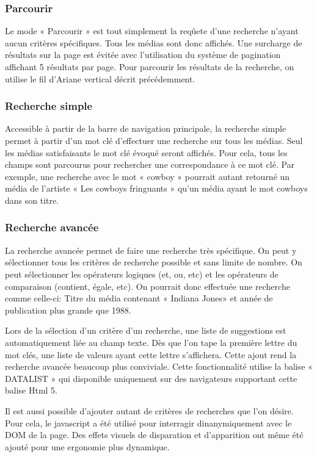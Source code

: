\documentclass[letter, 11pt]{report}
\begin{document}
\subsubsection{Parcourir}
Le mode « Parcourir » est tout simplement la reqûete d'une recherche n'ayant aucun critères spécifiques. Tous les médias sont donc affichés. Une surcharge de résultats sur la page est évitée avec l'utilisation du système de pagination
affichant 5 résultats par page. Pour parcourir les résultats de la recherche, on utilise le fil d'Ariane vertical décrit précédemment.
\subsubsection{Recherche simple}
Accessible à partir de la barre de navigation principale, la recherche simple permet à partir d'un mot clé d'effectuer une recherche sur tous les médias. Seul les médias satisfaisants le mot clé évoqué seront affichés. Pour cela, tous les champs sont parcourus pour rechercher une correspondance à ce mot clé. Par exemple, une recherche avec le mot « cowboy » pourrait autant retourné un média de l'artiste « Les cowboys fringuants » qu'un média ayant le mot cowboys dans son titre. 
\subsubsection{Recherche avancée}

La recherche avancée permet de faire une recherche très spécifique. On peut y sélectionner tous les critères de recherche possible et sans limite de nombre. On peut sélectionner les opérateurs logiques (et, ou, etc) et les opérateurs de comparaison (contient, égale, etc). On pourrait donc effectuée une recherche comme celle-ci: Titre du média contenant « Indiana Jones» et année de publication plus grande que 1988.

Lors de la sélection d'un critère d'un recherche, une liste de suggestions est automatiquement liée au champ texte. Dès que l'on tape la première lettre du mot clés, une liste de valeurs ayant cette lettre s'affichera. Cette ajout rend la recherche avancée beaucoup plus conviviale. Cette fonctionnalité utilise la balise « DATALIST » qui disponible uniquement sur des navigateurs supportant cette balise Html 5.

Il est aussi possible d'ajouter autant de critères de recherches que l'on désire. Pour cela, le javascript a été utilisé pour interragir dinanymiquement avec le DOM de la page. Des effets visuels de disparation et d'apparition ont même été ajouté pour une ergonomie plus dynamique.
\end{document}
